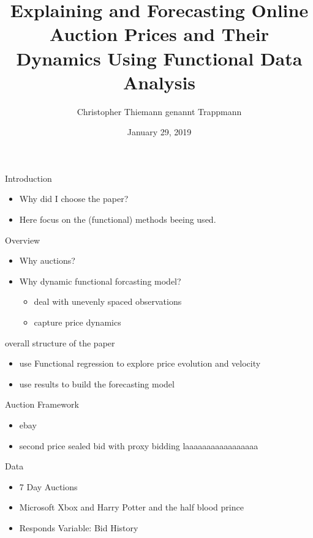 \documentclass[hyperref={pdfpagelabels=false}]{beamer}
\title{Explaining and Forecasting Online Auction
Prices and Their Dynamics Using
Functional Data Analysis}
\author{Christopher Thiemann genannt Trappmann}
\date{January 29, 2019}
\begin{document}
\begin{frame}
\titlepage
\end{frame}

\begin{frame}{Introduction} %
\begin{itemize}
	\item Why did I choose the paper? %
	\item Here focus on the (functional) methods beeing used.
\end{itemize}
\end{frame}

\begin{frame}{Overview}
\begin{itemize}
	\item Why auctions? %
	\item Why dynamic functional forcasting model?
	\begin{itemize}
		\item deal with unevenly spaced observations
		\item capture price dynamics
	\end{itemize}	
\end{itemize}
overall structure of the paper
\begin{itemize}
	\item use Functional regression to explore price evolution and velocity
	\item use results to build the forecasting model
\end{itemize}
\end{frame}

\begin{frame}{Auction Framework}
\begin{itemize}
	\item ebay
	\item second price sealed bid with proxy bidding laaaaaaaaaaaaaaaaa
\end{itemize}
Data
\begin{itemize}
	\item 7 Day Auctions
	\item Microsoft Xbox and Harry Potter and the half blood prince
	\item Responds Variable: Bid History
\end{itemize}
\end{frame}
\end{document}
